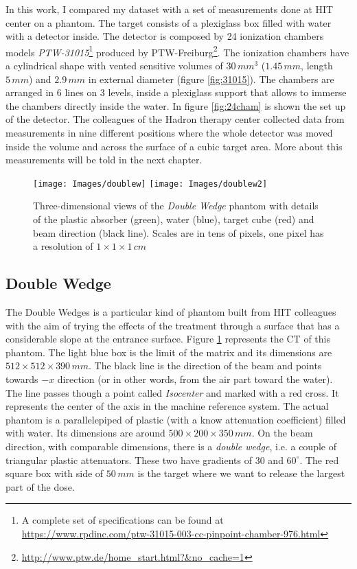 \documentclass[12pt, a4paper, twoside]{book}
\begin{document}
In this work, I compared my dataset with a set of measurements done at HIT center on a phantom. The target consists of a plexiglass box filled with water with a detector inside. The detector is composed by 24 ionization chambers models \emph{PTW-31015}\footnote{A complete set of specifications can be found at \url{https://www.rpdinc.com/ptw-31015-003-cc-pinpoint-chamber-976.html}} produced by PTW-Freiburg\footnote{\url{http://www.ptw.de/home_start.html?&no_cache=1}}. The ionization chambers have a cylindrical shape with vented sensitive volumes of $30\,mm^3$ ($1.45\,mm$, length $5\,mm$) and $2.9\,mm$ in external diameter (figure \ref{fig:31015}).
The chambers are arranged in 6 lines on 3 levels, inside a plexiglass support that allows to immerse the chambers directly inside the water. In figure \ref{fig:24cham} is shown the set up of the detector.
The colleagues of the Hadron therapy center collected data from measurements in nine different positions where the whole detector was moved inside the volume and across the surface of a cubic target area. More about this measurements will be told in the next chapter.

\begin{figure}[h]
{\texttt{[image: Images/doublew]}}
{\texttt{[image: Images/doublew2]}}
\caption{Three-dimensional views of the \emph{Double Wedge} phantom with details of the plastic absorber (green), water (blue), target cube (red) and beam direction (black line). Scales are in tens of pixels, one pixel has a resolution of $1\times1\times1\,cm$}
\label{fig:doublew}
\end{figure}

\subsection{Double Wedge} 
The Double Wedges is a particular kind of phantom built from HIT colleagues with the aim of trying the effects of the treatment through a surface that has a considerable slope at the entrance surface. 
Figure \ref{fig:doublew} represents the CT of this phantom. The light blue box is the limit of the matrix and its dimensions are $512\times512\times390\,mm$. The black line is the direction of the beam and points towards $-x$ direction (or in other words, from the air part toward the water). The line passes though a point called \emph{Isocenter} and marked with a red cross. It represents the center of the axis in the machine reference system.
The actual phantom is a parallelepiped of plastic (with a know attenuation coefficient) filled with water. Its dimensions are around $500\times200\times350\,mm$. On the beam direction, with comparable dimensions, there is a \emph{double wedge}, i.e. a couple of triangular plastic attenuators. These two have gradients of $30$ and $60^\circ$.
The red square box with side of $50\,mm$ is the target where we want to release the largest part of the dose. 
\end{document}
